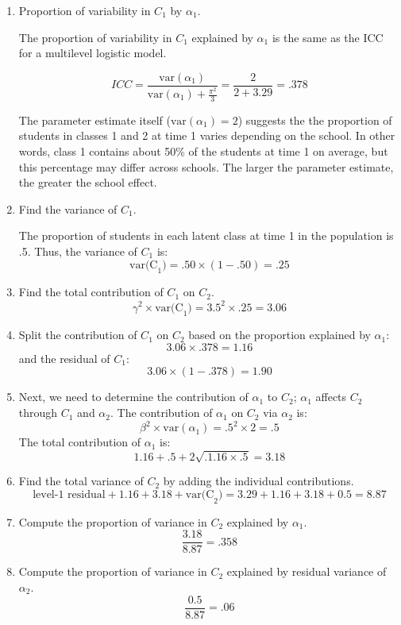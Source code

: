 \documentclass[man, noextraspace, floatsintext, 12pt]{apa7}
\begin{document}
\begin{enumerate}
\item Proportion of variability in $C_1$ by $\alpha_1$.

The proportion of variability in $C_1$ explained by $\alpha_1$ is the same as the ICC for a multilevel logistic model. 

\[ ICC = \frac{\textrm{var}(\alpha_1)}{\textrm{var}(\alpha_1) + \frac{\pi^2}{3}} = \frac{2}{2 + 3.29} = .378\]

The parameter estimate itself ($\textrm{var}(\alpha_1)=2$) suggests the the proportion of students in classes 1 and 2 at time 1 varies depending on the school. In other words, class 1 contains about 50\% of the students at time 1 on average, but this percentage may differ across schools. The larger the parameter estimate, the greater the school effect. 

\item Find the variance of $C_1$. 

The proportion of students in each latent class at time 1 in the population is .5. Thus, the variance of $C_1$ is:
\[ \textrm{var(C}_1)=.50\times(1-.50) = .25 \]

\item Find the total contribution of $C_1$ on $C_2$.
\[ \gamma^2\times\textrm{var(C}_1)=3.5^2\times.25 = 3.06 \]

\item Split the contribution of $C_1$ on $C_2$ based on the proportion explained by $\alpha_1$:
\[ 3.06\times.378 = 1.16\]
and the residual of $C_1$:
\[ 3.06 \times (1-.378) = 1.90 \]

\item Next, we need to determine the contribution of $\alpha_1$ to $C_2$; $\alpha_1$ affects $C_2$ through $C_1$ and $\alpha_2$. The contribution of $\alpha_1$ on $C_2$ via $\alpha_2$ is:
\[ \beta^2\times\textrm{var}(\alpha_1)=.5^2\times2 = .5\]
The total contribution of $\alpha_1$ is:
\[ 1.16 + .5 +2\sqrt{.1.16\times.5}=3.18\]

\item Find the total variance of $C_2$ by adding the individual contributions.
\[ \textrm{level-1 residual} + 1.16 + 3.18 + \textrm{var(C}_2) = 3.29 + 1.16+ 3.18 + 0.5 = 8.87 \]

\item Compute the proportion of variance in $C_2$ explained by $\alpha_1$.
\[ \frac{3.18}{8.87} = .358 \]

\item Compute the proportion of variance in $C_2$ explained by residual variance of $\alpha_2$.
\[ \frac{0.5}{8.87} = .06 \]


\end{enumerate}
\end{document}
